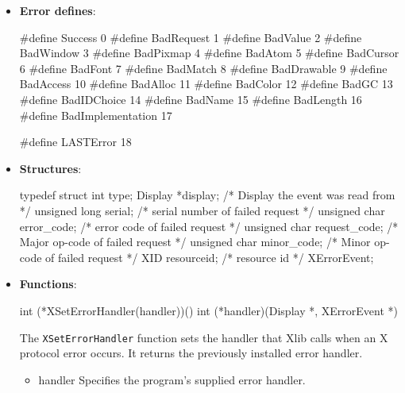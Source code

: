 \documentclass{report}
\begin{document}
    \pagebreak 
    \begin{itemize}
        \item \textbf{Error defines}:
            \bigbreak \noindent 
            \begin{cppcode}
            #define Success             0
            #define BadRequest          1
            #define BadValue            2
            #define BadWindow           3
            #define BadPixmap           4
            #define BadAtom             5
            #define BadCursor           6
            #define BadFont             7
            #define BadMatch            8
            #define BadDrawable         9
            #define BadAccess           10
            #define BadAlloc            11
            #define BadColor            12
            #define BadGC               13
            #define BadIDChoice         14
            #define BadName             15
            #define BadLength           16
            #define BadImplementation   17

            #define LASTError           18
            \end{cppcode}
        \item \textbf{Structures}: 
            \begin{cppcode}
                typedef struct {
                    int type;
                    Display *display;                   /* Display the event was read from */
                    unsigned long serial;               /* serial number of failed request */
                    unsigned char error_code;           /* error code of failed request */
                    unsigned char request_code;         /* Major op-code of failed request */
                    unsigned char minor_code;           /* Minor op-code of failed request */
                    XID resourceid;                     /* resource id */
                } XErrorEvent;
            \end{cppcode}
    \item \textbf{Functions}: 
        \begin{cppcode}
            int (*XSetErrorHandler(handler))()
                int (*handler)(Display *, XErrorEvent *)
        \end{cppcode}
        \bigbreak \noindent
        The \texttt{XSetErrorHandler} function sets the handler that Xlib calls when an X protocol error occurs. It returns the previously installed error handler.

        \begin{itemize}
            \item handler Specifies the program’s supplied error handler.
        \end{itemize}


\end{itemize}
\end{document}
